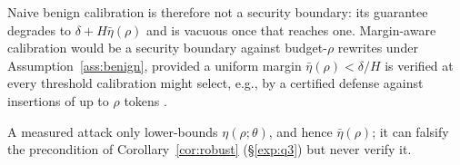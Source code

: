 Naive benign calibration is therefore not a security boundary: its guarantee
degrades to $\delta+H\bar\eta(\rho)$ and is vacuous once that reaches one.
Margin-aware calibration would be a security boundary against budget-$\rho$ rewrites under Assumption~\ref{ass:benign},
provided a uniform margin $\bar\eta(\rho)<\delta/H$ is verified at every threshold
calibration might select, e.g., by a certified defense against insertions of up to $\rho$ tokens
\citep{kumar2024certifying}.

A measured attack only lower-bounds $\eta(\rho;\theta)$, and hence $\bar\eta(\rho)$; it can falsify the
precondition of Corollary~\ref{cor:robust} (\S\ref{exp:q3}) but never verify it.
